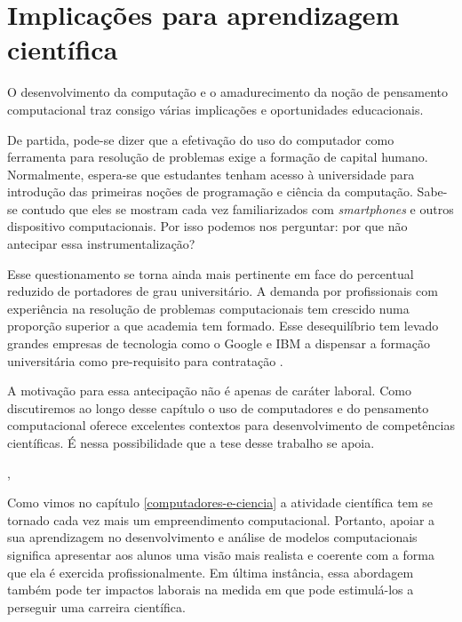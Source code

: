 \chapter{Implicações para aprendizagem científica}

O desenvolvimento da computação e o amadurecimento da noção de pensamento computacional traz consigo várias implicações e oportunidades educacionais.

De partida, pode-se dizer que a efetivação do uso do computador como ferramenta para resolução de problemas exige a formação de capital humano. Normalmente, espera-se que estudantes tenham acesso à universidade para introdução das primeiras noções de programação e ciência da computação. Sabe-se contudo que eles se mostram cada vez familiarizados com \textit{smartphones} e outros dispositivo computacionais. Por isso podemos nos perguntar: por que não antecipar essa instrumentalização? 

Esse questionamento se torna ainda mais pertinente em face do percentual reduzido de portadores de grau universitário. A demanda por profissionais com experiência na resolução de problemas computacionais tem crescido numa proporção superior a que academia tem formado. Esse desequilíbrio tem levado grandes empresas de tecnologia como o Google e IBM a dispensar a formação universitária como pre-requisito para contratação \cite{Purtill}.

A motivação para essa antecipação não é apenas de caráter laboral. Como discutiremos ao longo desse capítulo o uso de computadores e do pensamento computacional oferece excelentes contextos para desenvolvimento de competências científicas. É nessa possibilidade que a tese desse trabalho se apoia.

, 

Como vimos no capítulo \ref{computadores-e-ciencia} a atividade científica tem se tornado cada vez mais um empreendimento computacional. Portanto, apoiar a sua aprendizagem no desenvolvimento e análise de modelos computacionais significa apresentar aos alunos uma visão mais realista e coerente com a forma que ela é exercida profissionalmente. Em última instância, essa abordagem também pode ter impactos laborais na medida em que pode estimulá-los a perseguir uma carreira científica.











